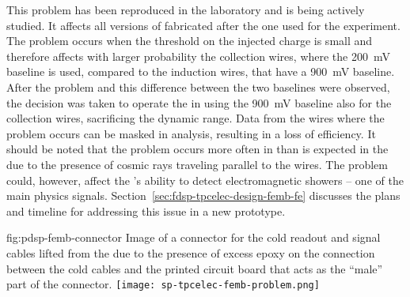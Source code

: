 This problem has been reproduced in the laboratory and is being actively 
studied. It affects all versions of  fabricated after 
the one used for the  experiment. The problem occurs 
when the threshold on the injected charge is small and therefore affects
with larger probability the collection wires, where the \SI{200}{mV} baseline 
is used, compared to the induction wires, that have a \SI{900}{mV} baseline.
After the problem and this difference between the two baselines were 
observed, the decision was taken to operate the  in  
using the \SI{900}{mV} baseline also for the collection wires, sacrificing
the dynamic range. Data from the wires where the problem occurs can
be masked in analysis, resulting in a loss of efficiency. It should be
noted that the problem occurs more often in  %
than is expected in the    due to the presence of cosmic rays traveling parallel
to the  wires. %
The problem %
could, however, affect the 's ability to detect
electromagnetic showers -- one of the main physics signals.
Section~\ref{sec:fdsp-tpcelec-design-femb-fe} discusses the plans and timeline for addressing this issue in a new  prototype.

\begin{dunefigure}
{fig:pdsp-femb-connector}
{Image of a connector for the cold readout and signal cables lifted from
the  due to the presence of excess epoxy on the 
connection between the cold cables and the printed circuit board
that acts as the ``male'' part of the connector.}
\texttt{[image: sp-tpcelec-femb-problem.png]}
\end{dunefigure}

